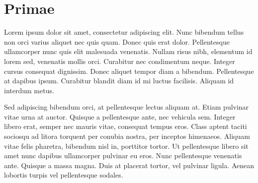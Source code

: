 \documentclass[balance]{test1}
\begin{document}
\section*{Primae}
Lorem ipsum dolor sit amet, consectetur adipiscing elit. Nunc bibendum tellus non orci varius aliquet nec quis quam. Donec quis erat dolor. Pellentesque ullamcorper nunc quis elit malesuada venenatis. Nullam risus nibh, elementum id lorem sed, venenatis mollis orci. Curabitur nec condimentum neque. Integer cursus consequat dignissim. Donec aliquet tempor diam a bibendum. Pellentesque at dapibus ipsum. Curabitur blandit diam id mi luctus facilisis. Aliquam id interdum metus.

Sed adipiscing bibendum orci, at pellentesque lectus aliquam at. Etiam pulvinar vitae urna at auctor. Quisque a pellentesque ante, nec vehicula sem. Integer libero erat, semper nec mauris vitae, consequat tempus eros. Class aptent taciti sociosqu ad litora torquent per conubia nostra, per inceptos himenaeos. Aliquam vitae felis pharetra, bibendum nisl in, porttitor tortor. Ut pellentesque libero sit amet nunc dapibus ullamcorper pulvinar eu eros. Nunc pellentesque venenatis ante. Quisque a massa magna. Duis at placerat tortor, vel pulvinar ligula. Aenean lobortis turpis vel pellentesque sodales.
\end{document}
